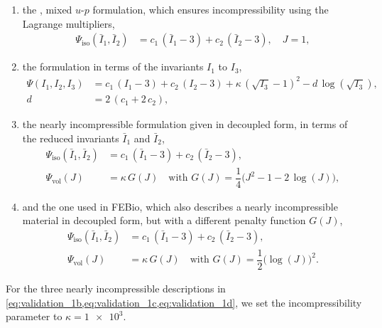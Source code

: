 \begin{enumerate}[label=(\roman*)]
\item the , mixed $u$-$p$ formulation, which ensures incompressibility using the Lagrange multipliers,
\begin{align}
    \Psi_\text{iso}(\bar{I}_1,\bar{I}_2) &= c_1\,(\bar{I}_1 - 3) + c_2\,(\bar{I}_2 - 3), \quad J=1, \label{eq:validation_incompressible}
\end{align}
\item the  formulation in terms of the invariants $I_1$ to $I_3$,
\begin{subequations}\label{eq:validation_1b}
  \begin{align}      
      \Psi(I_1,I_2,I_3) &= c_1\,(I_1 - 3) + c_2\,(I_2 - 3) + \kappa\,(\sqrt{I_3} - 1)^2 - d\,\log(\sqrt{I_3}),\label{eq:validation_nearly_incompressible_1} \\
         d &= 2\,(c_1 + 2\,c_2) \label{eq:validation_nearly_incompressible},
\end{align}
\end{subequations}
\item the nearly incompressible formulation given in decoupled form, in terms of the reduced invariants $\bar{I}_1$ and $\bar{I}_2$,
\begin{subequations}\label{eq:validation_1c}
  \begin{align}
      \Psi_\text{iso}(\bar{I}_1,\bar{I}_2) &= c_1\,(\bar{I}_1 - 3) + c_2\,(\bar{I}_2 - 3),\label{eq:validation_nearly_incompressible_decoupled_1} \\ 
      \Psi_\text{vol}(J) &= \kappa\,G(J) \quad\text{with }  G(J) = \dfrac14\big(J^2 - 1 - 2\,\log(J)\big), \label{eq:validation_nearly_incompressible_decoupled}
  \end{align}
\end{subequations}
\item and the one used in FEBio, which also describes a nearly incompressible material in decoupled form, but with a different penalty function $G(J)$,
\begin{subequations}\label{eq:validation_1d}
  \begin{align}
      \Psi_\text{iso}(\bar{I}_1,\bar{I}_2) &= c_1\,(\bar{I}_1 - 3) + c_2\,(\bar{I}_2 - 3),\label{eq:validation_nearly_incompressible_decoupled_febio_1} \\ 
      \Psi_\text{vol}(J) &= \kappa\,G(J) \quad\text{with } G(J) = \dfrac12\big(\log(J)\big)^2 \label{eq:validation_nearly_incompressible_decoupled_febio}.
  \end{align}
\end{subequations}
\end{enumerate}
%
For the three nearly incompressible descriptions in \cref{eq:validation_1b,eq:validation_1c,eq:validation_1d}, we set the incompressibility parameter to $\kappa=\num{1e3}$.

